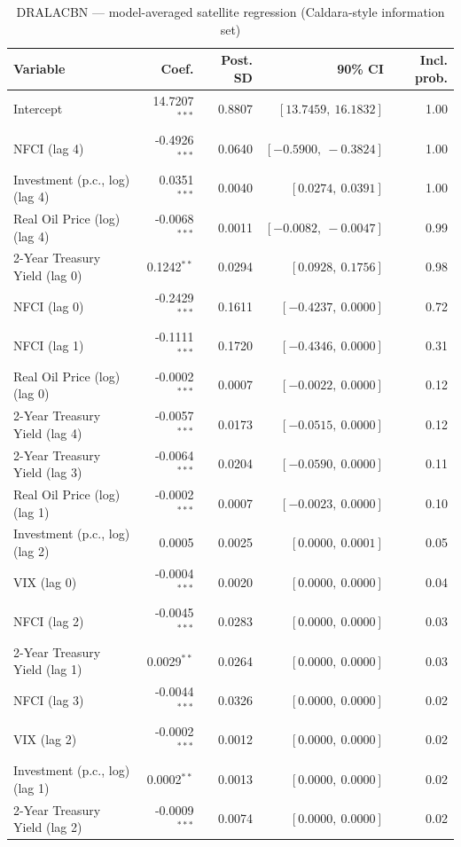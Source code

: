 \begin{table}[!htbp]
\centering
\caption{DRALACBN --- model-averaged satellite regression (Caldara-style information set)}
\label{tab:dralacbn_caldara_style_bma_satellite}
\begin{tabular}{lrrrr}
\toprule
Variable & Coef. & Post. SD & 90\% CI & Incl. prob. \\
\midrule
Intercept & 14.7207$^{***}$ & 0.8807 & $[13.7459,\ 16.1832]$ & 1.00 \\
NFCI (lag 4) & -0.4926$^{***}$ & 0.0640 & $[-0.5900,\ -0.3824]$ & 1.00 \\
Investment (p.c., log) (lag 4) & 0.0351$^{***}$ & 0.0040 & $[0.0274,\ 0.0391]$ & 1.00 \\
Real Oil Price (log) (lag 4) & -0.0068$^{***}$ & 0.0011 & $[-0.0082,\ -0.0047]$ & 0.99 \\
2-Year Treasury Yield (lag 0) & 0.1242$^{**}$ & 0.0294 & $[0.0928,\ 0.1756]$ & 0.98 \\
NFCI (lag 0) & -0.2429$^{***}$ & 0.1611 & $[-0.4237,\ 0.0000]$ & 0.72 \\
NFCI (lag 1) & -0.1111$^{***}$ & 0.1720 & $[-0.4346,\ 0.0000]$ & 0.31 \\
Real Oil Price (log) (lag 0) & -0.0002$^{***}$ & 0.0007 & $[-0.0022,\ 0.0000]$ & 0.12 \\
2-Year Treasury Yield (lag 4) & -0.0057$^{***}$ & 0.0173 & $[-0.0515,\ 0.0000]$ & 0.12 \\
2-Year Treasury Yield (lag 3) & -0.0064$^{***}$ & 0.0204 & $[-0.0590,\ 0.0000]$ & 0.11 \\
Real Oil Price (log) (lag 1) & -0.0002$^{***}$ & 0.0007 & $[-0.0023,\ 0.0000]$ & 0.10 \\
Investment (p.c., log) (lag 2) & 0.0005 & 0.0025 & $[0.0000,\ 0.0001]$ & 0.05 \\
VIX (lag 0) & -0.0004$^{***}$ & 0.0020 & $[0.0000,\ 0.0000]$ & 0.04 \\
NFCI (lag 2) & -0.0045$^{***}$ & 0.0283 & $[0.0000,\ 0.0000]$ & 0.03 \\
2-Year Treasury Yield (lag 1) & 0.0029$^{**}$ & 0.0264 & $[0.0000,\ 0.0000]$ & 0.03 \\
NFCI (lag 3) & -0.0044$^{***}$ & 0.0326 & $[0.0000,\ 0.0000]$ & 0.02 \\
VIX (lag 2) & -0.0002$^{***}$ & 0.0012 & $[0.0000,\ 0.0000]$ & 0.02 \\
Investment (p.c., log) (lag 1) & 0.0002$^{**}$ & 0.0013 & $[0.0000,\ 0.0000]$ & 0.02 \\
2-Year Treasury Yield (lag 2) & -0.0009$^{***}$ & 0.0074 & $[0.0000,\ 0.0000]$ & 0.02 \\

\end{tabular}
\end{table}
